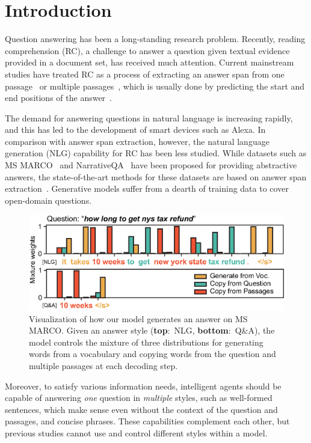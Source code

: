\documentclass[11pt,a4paper]{article}
\theoremstyle{mydef}
\theoremstyle{myprob}
\begin{document}
\section{Introduction}
\label{sec:intro}

Question answering has been a long-standing research problem. Recently, reading comprehension (RC), a challenge to answer a question given textual evidence provided in a document set, has received much attention. 
Current mainstream studies have treated RC as a process of extracting an answer span from one passage~\citep{RajpurkarZLL16,RajpurkarJL18} or multiple passages~\citep{JoshiCWZ17,Yang0ZBCSM18}, which is usually done by predicting the start and end positions of the answer~\citep{Yu18,DevlinCLT18}. 

The demand for answering questions in natural language is increasing rapidly, and this has led to the development of smart devices such as Alexa. In comparison with answer span extraction, however, the natural language generation (NLG) capability for RC has been less studied. While datasets such as MS MARCO~\citep{Bajaj18} and NarrativeQA~\citep{KociskySBDHMG18} have been proposed for providing abstractive answers, the state-of-the-art methods for these datasets
are based on answer span extraction~\citep{WuWLHWLLL18,HuPWHLYZ18}.  
Generative models 
suffer from a dearth of training data to cover open-domain questions.


\begin{figure}[t!]
\centering
\includegraphics[width=.48\textwidth]{./images/masque_mixratio2.eps}
\caption{Visualization of how our model generates an answer on MS MARCO.
Given an answer style (\textbf{top}:~NLG, \textbf{bottom}:~Q\&A), the model controls the mixture of three distributions for generating words from a vocabulary and copying words from the question and multiple passages at each decoding step.
}
\label{fig:mixratio}
\end{figure}
 
Moreover, to satisfy various information needs, intelligent agents should be capable of answering \textit{one} question in \textit{multiple} styles, such as well-formed sentences,
which make sense even without the context of the question and passages,
and concise phrases. These capabilities complement each other, but 
previous studies
cannot use and control different styles within a model.
\end{document}
